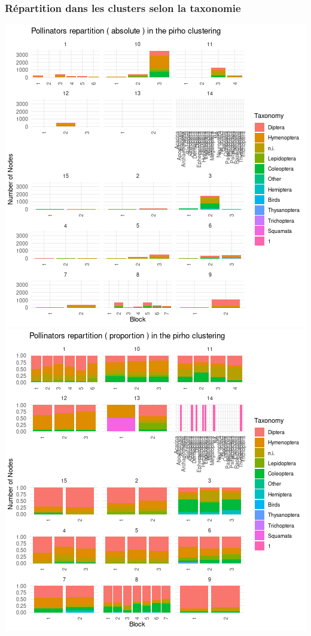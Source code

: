 \hypertarget{ruxe9partition-dans-les-clusters-selon-la-taxonomie-3}{%
\subsubsection{Répartition dans les clusters selon la
taxonomie}\label{ruxe9partition-dans-les-clusters-selon-la-taxonomie-3}}

\includegraphics{figure/pirho_plot_taxonomy_pollinators-1.png}\includegraphics{figure/pirho_plot_taxonomy_pollinators-2.png}

